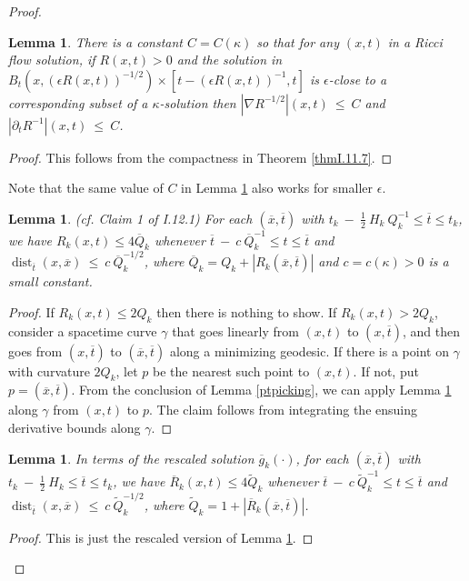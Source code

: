 \documentclass[12pt]{amsart}
\newcommand{\dist}{\operatorname{dist}}
\numberwithin{equation}{section}
\theoremstyle{plain}
\newtheorem{lemma}[equation]{Lemma}
\theoremstyle{definition}
\theoremstyle{remark}
\begin{document}
\begin{proof}
\begin{lemma} \label{grad}
There is a constant $C = C(\kappa)$ so that for any $(x, t)$ in a
Ricci flow solution, if $R(x, t) > 0$ and the solution in
$B_t(x, (\epsilon R(x, t))^{-1/2}) \times [t-(\epsilon R(x, t))^{-1}, t]$
is $\epsilon$-close to a corresponding subset of a $\kappa$-solution
then $|\nabla R^{-1/2}|(x, t) \: \le \: C$ and
$|\partial_t R^{-1}|(x,t) \: \le \: C$.
\end{lemma}
\begin{proof}
This follows from the compactness in Theorem \ref{thmI.11.7}.
\end{proof}

Note that the same value of $C$ in Lemma \ref{grad}
also works for smaller $\epsilon$.
 
\begin{lemma} (cf. Claim 1 of I.12.1)
\label{claim1} For each $(\overline{x}, \overline{t})$ with
$t_k \: - \: \frac12 \: H_k \: Q_k^{-1} \le \overline{t} \le t_k$, we have
$R_k(x, t) \le 4 \overline{Q}_k$ whenever 
$\overline{t} \: - \: c \: \overline{Q}_k^{-1} \le t \le \overline{t}$ and
$\dist_{\overline{t}}(x, \overline{x}) \: \le \: c \: \overline{Q}_k^{-1/2}$,
where $\overline{Q}_k = Q_k + |R_k(\overline{x}, \overline{t})|$ and
$c = c(\kappa) > 0$ is a small constant. 
\end{lemma}
\begin{proof}
If $R_k(x, t) \le 2Q_k$ then there is nothing to show.  If
$R_k(x, t) > 2Q_k$, consider a spacetime curve $\gamma$ that goes linearly from
$(x,t)$ to $(x, \overline{t})$, and then goes from
$(x, \overline{t})$ to $(\overline{x}, \overline{t})$ along a
minimizing geodesic.  If there is a point on $\gamma$ with curvature
$2Q_k$, let $p$ be the nearest such point to $(x, t)$. If not, put
$p = (\overline{x}, \overline{t})$. From the conclusion of Lemma
\ref{ptpicking}, we can apply 
Lemma \ref{grad} along $\gamma$ from $(x, t)$ to $p$.
The claim follows from integrating the ensuing 
derivative bounds along $\gamma$.
\end{proof}

\begin{lemma} \label{rescaled}
In terms of the rescaled solution $\overline{g}_k(\cdot)$,
for each $(\overline{x}, \overline{t})$ with
$t_k \: - \: \frac12 \: H_k \le \overline{t} \le t_k$, we have
$\overline{R}_k(x, t) \le 4 \widetilde{Q}_k$ whenever 
$\overline{t} \: - \: c \: \widetilde{Q}_k^{-1} \le t \le \overline{t}$ and
$\dist_{\overline{t}}(x, \overline{x}) \: \le \: c \: \widetilde{Q}_k^{-1/2}$,
where $\widetilde{Q}_k = 1 + |\overline{R}_k(\overline{x}, \overline{t})|$.
\end{lemma}
\begin{proof}
This is just the rescaled version of Lemma \ref{claim1}.
\end{proof}


\end{proof}
\end{document}
